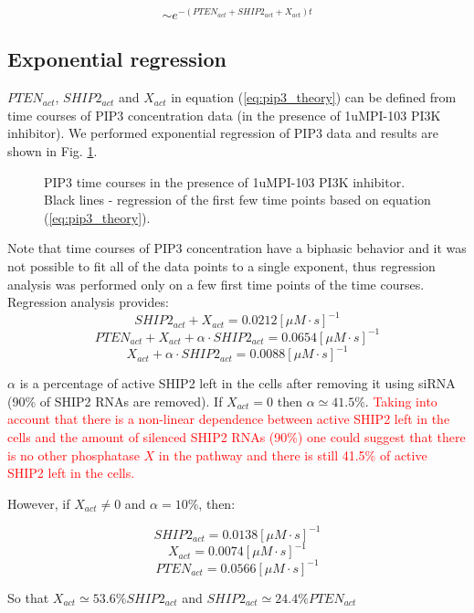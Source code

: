 \documentclass[12pt]{article} %
\begin{document}
\begin{equation}
 [PIP3] \sim e^{-(PTEN_{act} + SHIP2_{act} + X_{act})t}
 \label{eq:pip3_theory}
\end{equation}

\subsection{Exponential regression} %

\(PTEN_{act}\), \(SHIP2_{act}\) and \(X_{act}\) in equation (\ref{eq:pip3_theory}) can be defined from time courses of PIP3 concentration data (in the presence of 1uMPI-103 PI3K inhibitor). We performed exponential regression of PIP3 data and results are shown in Fig. \ref{fig:regressions}.

\begin{figure}[H] %
\caption{PIP3 time courses in the presence of 1uMPI-103 PI3K inhibitor. Black lines - regression of the first few time points based on equation (\ref{eq:pip3_theory}).}
\label{fig:regressions}
\end{figure}

Note that time courses of PIP3 concentration have a biphasic behavior and it was not possible to fit all of the data points to a single exponent, thus regression analysis was performed only on a few first time points of the time courses. Regression analysis provides:
\[SHIP2_{act} + X_{act} = 0.0212 [\mu M\cdot s]^{-1}\]
\[PTEN_{act} + X_{act} + \alpha \cdot SHIP2_{act} = 0.0654 [\mu M\cdot s]^{-1}\]
\[X_{act} + \alpha \cdot SHIP2_{act} = 0.0088 [\mu M\cdot s]^{-1}\]

\(\alpha\) is a percentage of active SHIP2 left in the cells after removing it using siRNA (90\% of SHIP2 RNAs are removed). If \(X_{act} = 0\) then \(\alpha \simeq 41.5 \%\). \textcolor{red}{Taking into account that there is a non-linear dependence between active SHIP2 left in the cells and the amount of silenced SHIP2 RNAs (90\%) one could suggest that there is no other phosphatase \(X\) in the pathway and there is still 41.5\% of active SHIP2 left in the cells.}

However, if \(X_{act} \neq 0\) and \(\alpha = 10\%\), then:

\[SHIP2_{act} = 0.0138 [\mu M\cdot s]^{-1}\]
\[X_{act} = 0.0074 [\mu M\cdot s]^{-1}\] 
\[PTEN_{act} = 0.0566 [\mu M\cdot s]^{-1}\]

So that \(X_{act} \simeq 53.6\% SHIP2_{act}\) and \(SHIP2_{act} \simeq 24.4\% PTEN_{act}\)
\end{document}

